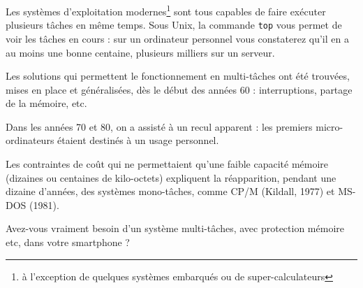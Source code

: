 \begin{multicols}{2}
Les systèmes d'exploitation modernes\footnote{à l'exception de quelques systèmes embarqués ou de super-calculateurs} sont tous capables de faire
exécuter plusieurs tâches en même temps.  Sous Unix, la commande
\texttt{top} vous permet de voir les tâches en cours : sur un
ordinateur personnel vous constaterez qu'il en a au moins une bonne
centaine, plusieurs milliers sur un serveur.

Les solutions qui permettent le fonctionnement en multi-tâches ont été 
trouvées, mises en place et généralisées, dès le début des années 60 :
interruptions, partage de la mémoire, etc.

Dans les années 70 et 80, on a assisté à un recul apparent : les
premiers micro-ordinateurs étaient destinés à un usage personnel. 

Les contraintes de coût qui ne permettaient qu'une faible capacité
mémoire (dizaines ou centaines de kilo-octets) expliquent la
réapparition, pendant une dizaine d'années, des systèmes mono-tâches,
comme CP/M (Kildall, 1977) et MS-DOS (1981).

\begin{exercice}
Avez-vous vraiment besoin d'un système multi-tâches, avec protection
mémoire etc, dans votre smartphone ?
\end{exercice}


\end{multicols}
